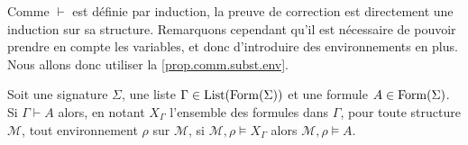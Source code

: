 Comme $\vdash$ est définie par induction, la preuve de correction est directement
une induction sur sa structure. Remarquons cependant qu'il est nécessaire de
pouvoir prendre en compte les variables, et donc d'introduire des environnements
en plus. Nous allons donc utiliser la \cref{prop.comm.subst.env}.

\begin{theorem}[Correction]
  Soit une signature $\Sigma$, une liste $\Gamma\in\operatorname{List}(\operatorname{Form}(\Sigma))$ et
  une formule $A\in\operatorname{Form}(\Sigma)$. Si $\Gamma\vdash A$ alors, en notant
  $X_\Gamma$ l'ensemble des formules dans $\Gamma$, pour toute structure
  $\mathcal M$, tout environnement $\rho$ sur $\mathcal M$, si
  $\mathcal M,\rho\models X_\Gamma$ alors $\mathcal M,\rho\models A$.
\end{theorem}

